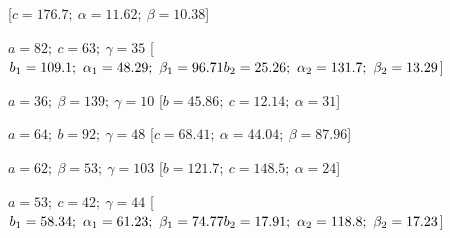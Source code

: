 \begin{esercizio}
\begin{enumeratea}
   \hfill [\(c=176.7;~\alpha=11.62;~\beta=10.38\)]
  \item  \(a=82;~c=63;~\gamma=35\)
   \hfill [\(b_1=109.1;~\alpha_1=48.29;~\beta_1=96.71 \\
   {} \hfill          b_2=25.26;~\alpha_2=131.7;~\beta_2=13.29\)]
  \item  \(a=36;~\beta=139;~\gamma=10\)
   \hfill [\(b=45.86;~c=12.14;~\alpha=31\)]
  \item  \(a=64;~b=92;~\gamma=48\)
   \hfill [\(c=68.41;~\alpha=44.04;~\beta=87.96\)]
  \item  \(a=62;~\beta=53;~\gamma=103\)
   \hfill [\(b=121.7;~c=148.5;~\alpha=24\)]
  \item  \(a=53;~c=42;~\gamma=44\)
   \hfill [\(b_1=58.34;~\alpha_1=61.23;~\beta_1=74.77 \\
   {} \hfill          b_2=17.91;~\alpha_2=118.8;~\beta_2=17.23\)]
 \end{enumeratea}
\end{esercizio}

